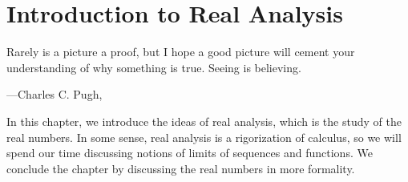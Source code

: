 \documentclass[../notes.tex]{subfiles}
\begin{document}
\chapter{Introduction to Real Analysis}
\epigraph{Rarely is a picture a proof, but I hope a good picture will cement your understanding of why something is true. Seeing is believing.}
{---Charles C. Pugh, \cite{pugh-analysis}}
In this chapter, we introduce the ideas of real analysis, which is the study of the real numbers. In some sense, real analysis is a rigorization of calculus, so we will spend our time discussing notions of limits of sequences and functions. We conclude the chapter by discussing the real numbers in more formality.




\end{document}
